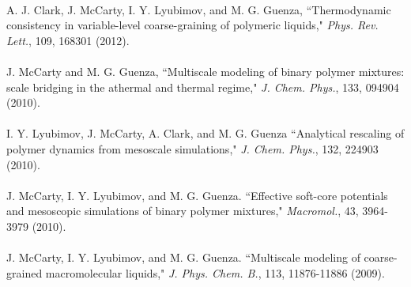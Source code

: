 \documentclass[10pt]{article} %
\begin{document}
\\
A. J. Clark, J. McCarty, I. Y. Lyubimov, and M. G. Guenza, ``Thermodynamic consistency in variable-level coarse-graining of polymeric liquids," {\it Phys. Rev. Lett.}, 109, 168301 (2012).\\
\\
J. McCarty and M. G. Guenza, ``Multiscale modeling of binary polymer mixtures: scale bridging in the athermal and thermal regime," {\it J. Chem. Phys.}, 133, 094904 (2010). \\
\\
I. Y. Lyubimov, J. McCarty, A. Clark, and M. G. Guenza ``Analytical rescaling of polymer dynamics from mesoscale simulations," {\it J. Chem. Phys.}, 132, 224903 (2010). \\
\\
J. McCarty, I. Y. Lyubimov, and M. G. Guenza. ``Effective soft-core potentials and mesoscopic simulations of binary polymer mixtures," {\it Macromol.}, 43, 3964-3979 (2010). \\
\\
J. McCarty, I. Y. Lyubimov, and M. G. Guenza. ``Multiscale modeling of coarse- grained macromolecular liquids," {\it J. Phys. Chem. B.}, 113, 11876-11886 (2009). 

 
\end{document}
